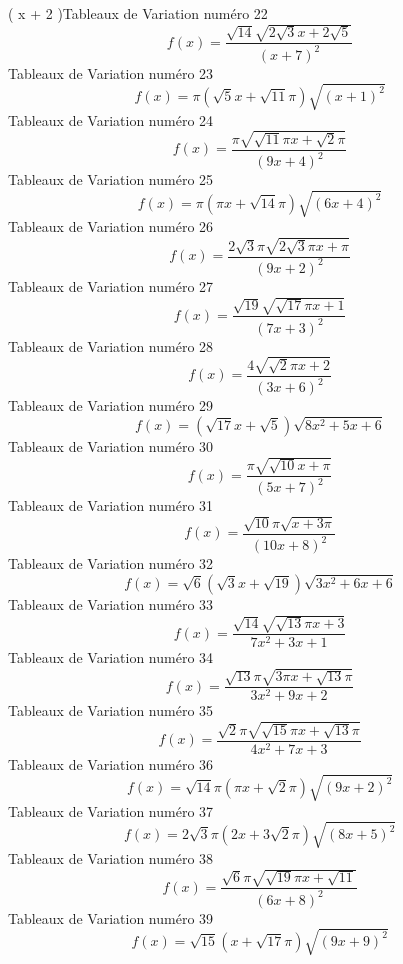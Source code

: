 \documentclass{article}
\begin{document}
\left( x + 2 \pi\right)\]Tableaux de Variation num\'ero 22 \[f(x) = \frac{\sqrt{14} \sqrt{2 \sqrt{3} x + 2 \sqrt{5}}}{\left(x + 7\right)^{2}}\]Tableaux de Variation num\'ero 23 \[f(x) = \pi \left(\sqrt{5} x + \sqrt{11} \pi\right) \sqrt{\left(x + 1\right)^{2}}\]Tableaux de Variation num\'ero 24 \[f(x) = \frac{\pi \sqrt{\sqrt{11} \pi x + \sqrt{2} \pi}}{\left(9 x + 4\right)^{2}}\]Tableaux de Variation num\'ero 25 \[f(x) = \pi \left(\pi x + \sqrt{14} \pi\right) \sqrt{\left(6 x + 4\right)^{2}}\]Tableaux de Variation num\'ero 26 \[f(x) = \frac{2 \sqrt{3} \pi \sqrt{2 \sqrt{3} \pi x + \pi}}{\left(9 x + 2\right)^{2}}\]Tableaux de Variation num\'ero 27 \[f(x) = \frac{\sqrt{19} \sqrt{\sqrt{17} \pi x + 1}}{\left(7 x + 3\right)^{2}}\]Tableaux de Variation num\'ero 28 \[f(x) = \frac{4 \sqrt{\sqrt{2} \pi x + 2}}{\left(3 x + 6\right)^{2}}\]Tableaux de Variation num\'ero 29 \[f(x) = \left(\sqrt{17} x + \sqrt{5}\right) \sqrt{8 x^{2} + 5 x + 6}\]Tableaux de Variation num\'ero 30 \[f(x) = \frac{\pi \sqrt{\sqrt{10} x + \pi}}{\left(5 x + 7\right)^{2}}\]Tableaux de Variation num\'ero 31 \[f(x) = \frac{\sqrt{10} \pi \sqrt{x + 3 \pi}}{\left(10 x + 8\right)^{2}}\]Tableaux de Variation num\'ero 32 \[f(x) = \sqrt{6} \left(\sqrt{3} x + \sqrt{19}\right) \sqrt{3 x^{2} + 6 x + 6}\]Tableaux de Variation num\'ero 33 \[f(x) = \frac{\sqrt{14} \sqrt{\sqrt{13} \pi x + 3}}{7 x^{2} + 3 x + 1}\]Tableaux de Variation num\'ero 34 \[f(x) = \frac{\sqrt{13} \pi \sqrt{3 \pi x + \sqrt{13} \pi}}{3 x^{2} + 9 x + 2}\]Tableaux de Variation num\'ero 35 \[f(x) = \frac{\sqrt{2} \pi \sqrt{\sqrt{15} \pi x + \sqrt{13} \pi}}{4 x^{2} + 7 x + 3}\]Tableaux de Variation num\'ero 36 \[f(x) = \sqrt{14} \pi \left(\pi x + \sqrt{2} \pi\right) \sqrt{\left(9 x + 2\right)^{2}}\]Tableaux de Variation num\'ero 37 \[f(x) = 2 \sqrt{3} \pi \left(2 x + 3 \sqrt{2} \pi\right) \sqrt{\left(8 x + 5\right)^{2}}\]Tableaux de Variation num\'ero 38 \[f(x) = \frac{\sqrt{6} \pi \sqrt{\sqrt{19} \pi x + \sqrt{11}}}{\left(6 x + 8\right)^{2}}\]Tableaux de Variation num\'ero 39 \[f(x) = \sqrt{15} \left(x + \sqrt{17} \pi\right) \sqrt{\left(9 x + 9\right)^{2}}\]
\end{document}
